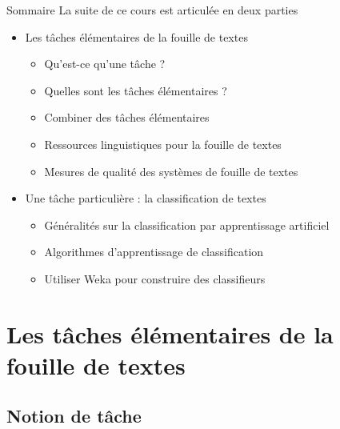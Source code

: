 \documentclass[hyperref={unicode}, xcolor={svgnames}, french]{beamer}
\begin{document}
\begin{frame}{Sommaire}
    La suite de ce cours est articulée en deux parties
    \begin{itemize}
        \item Les tâches élémentaires de la fouille de textes
             \begin{itemize}
                 \item Qu'est-ce qu'une tâche ?
                 \item Quelles sont les tâches élémentaires ?
                 \item Combiner des tâches élémentaires
                 \item Ressources linguistiques pour la fouille de textes
                 \item Mesures de qualité des systèmes de fouille de textes
             \end{itemize}
        \item Une tâche particulière : la classification de textes
            \begin{itemize}
                \item Généralités sur la classification par apprentissage artificiel
                \item Algorithmes d'apprentissage de classification
                \item Utiliser Weka pour construire des classifieurs
            \end{itemize}
    \end{itemize}
\end{frame}


\section{Les tâches élémentaires de la fouille de textes}

\subsection{Notion de tâche}
\end{document}

